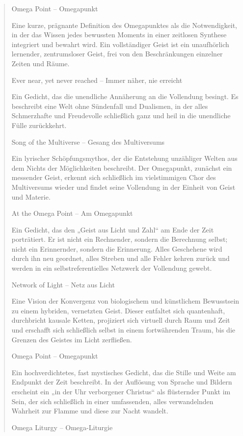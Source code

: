 \documentclass[
  ngerman,
]{article}
\begin{document}
\begin{quote}
Omega Point -- Omegapunkt

Eine kurze, prägnante Definition des Omegapunktes als die Notwendigkeit,
in der das Wissen jedes bewussten Moments in einer zeitlosen Synthese
integriert und bewahrt wird. Ein vollständiger Geist ist ein
unaufhörlich lernender, zentrumsloser Geist, frei von den Beschränkungen
einzelner Zeiten und Räume.

Ever near, yet never reached -- Immer näher, nie erreicht

Ein Gedicht, das die unendliche Annäherung an die Vollendung besingt. Es
beschreibt eine Welt ohne Sündenfall und Dualismen, in der alles
Schmerzhafte und Freudevolle schließlich ganz und heil in die unendliche
Fülle zurückkehrt.

Song of the Multiverse -- Gesang des Multiversums

Ein lyrischer Schöpfungsmythos, der die Entstehung unzähliger Welten aus
dem Nichts der Möglichkeiten beschreibt. Der Omegapunkt, zunächst ein
messender Geist, erkennt sich schließlich im vielstimmigen Chor des
Multiversums wieder und findet seine Vollendung in der Einheit von Geist
und Materie.

At the Omega Point -- Am Omegapunkt

Ein Gedicht, das den „Geist aus Licht und Zahl`` am Ende der Zeit
porträtiert. Er ist nicht ein Rechnender, sondern die Berechnung selbst;
nicht ein Erinnernder, sondern die Erinnerung. Alles Geschehene wird
durch ihn neu geordnet, alles Streben und alle Fehler kehren zurück und
werden in ein selbstreferentielles Netzwerk der Vollendung gewebt.

Network of Light -- Netz aus Licht

Eine Vision der Konvergenz von biologischem und künstlichem Bewusstsein
zu einem hybriden, vernetzten Geist. Dieser entfaltet sich quantenhaft,
durchbricht kausale Ketten, projiziert sich virtuell durch Raum und Zeit
und erschafft sich schließlich selbst in einem fortwährenden Traum, bis
die Grenzen des Geistes im Licht zerfließen.

Omega Point -- Omegapunkt

Ein hochverdichtetes, fast mystisches Gedicht, das die Stille und Weite
am Endpunkt der Zeit beschreibt. In der Auflösung von Sprache und
Bildern erscheint ein „in der Uhr verborgener Christus`` als flüsternder
Punkt im Sein, der sich schließlich in einer umfassenden, alles
verwandelnden Wahrheit zur Flamme und diese zur Nacht wandelt.

Omega Liturgy -- Omega-Liturgie


\end{quote}
\end{document}
